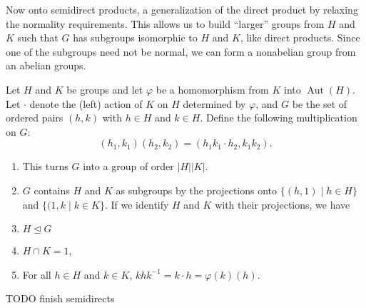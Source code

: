 \orbreak
Now onto semidirect products, a generalization of the direct product by relaxing the normality requirements. This allows us to build ``larger'' groups from $H$ and $K$ such that $G$ has subgroups isomorphic to $H$ and $K$, like direct products. Since one of the subgroups need not be normal, we can form a nonabelian group from an abelian groups. 
\begin{theorem}
    Let $H$ and $K$ be groups and let $\varphi $ be a homomorphism from $K$ into $\operatorname{Aut}(H)$. Let $\cdot $ denote the (left) action of $K$ on $H$ determined by $\varphi $, and $G$ be the set of ordered pairs $(h,k)$ with $h\in H$ and $k\in H$. Define the following multiplication on $G$: \[
        (h_1,k_1)(h_2,k_2)=(h_1k_1\cdot h_2,k_1k_2).
    \] 
    \begin{enumerate}[label=(\arabic*)]
        \item This turns $G$ into a group of order $|H| |K|$.
        \item $G$ contains $H$ and $K$ as subgroups by the projections onto $\{(h,1 )\mid h\in H \} $ and $\{(1,k \mid k\in K\} $. If we identify $H$ and $K$ with their projections, we have
        \item $H\trianglelefteq G$ 
        \item $H\cap K=1$,
        \item For all $h\in H$ and $k\in K$, $khk^{-1}=k\cdot h=\varphi (k)(h)$.
    \end{enumerate}
\end{theorem}
TODO finish semidirects
